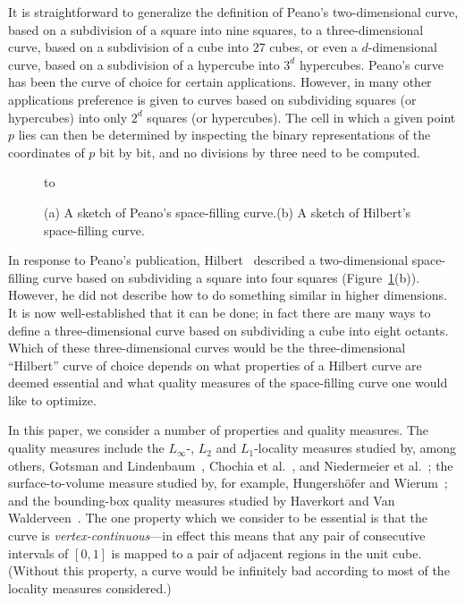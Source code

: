 \documentclass[11pt,a4paper]{article}
\begin{document}
It is straightforward to generalize the definition of Peano's two-dimensional curve, based on a subdivision of a square into nine squares, to a three-dimensional curve, based on a subdivision of a cube into 27 cubes, or even a $d$-dimensional curve, based on a subdivision of a hypercube into $3^d$ hypercubes. Peano's curve has been the curve of choice for certain applications. However, in many other applications preference is given to curves based on subdividing squares (or hypercubes) into only $2^d$ squares (or hypercubes). The cell in which a given point $p$ lies can then be determined by inspecting the binary representations of the coordinates of $p$ bit by bit, and no divisions by three need to be computed. 
\begin{figure}
\centering
\hbox to 
\caption{(a) A sketch of Peano's space-filling curve.\quad (b) A sketch of Hilbert's space-filling curve.}
\label{fig:peano2d}\label{fig:hilbert2d}
\end{figure}

In response to Peano's publication, Hilbert~\cite{Hilbert} described a two-dimensional space-filling curve based on subdividing a square into four squares (Figure~\ref{fig:hilbert2d}(b)). However, he did not describe how to do something similar in higher dimensions. It is now well-established that it can be done; in fact there are many ways to define a three-dimensional curve based on subdividing a cube into eight octants. Which of these three-dimensional curves would be the three-dimensional ``Hilbert'' curve of choice depends on what properties of a Hilbert curve are deemed essential and what quality measures of the space-filling curve one would like to optimize.

In this paper, we consider a number of properties and quality measures. The quality measures include the $L_\infty$-, $L_2$ and $L_1$-locality measures studied by, among others, Gotsman and Lindenbaum~\cite{Gotsman}, Chochia et al.~\cite{Chochia}, and Niedermeier et al.~\cite{Niedermeier,Niedermeier-Manhattan}; the surface-to-volume measure studied by, for example, Hungersh\"ofer and Wierum~\cite{Hungershoefer}; and the bounding-box quality measures studied by Haverkort and Van Walderveen~\cite{Haverkort}. The one property which we consider to be essential is that the curve is \emph{vertex-continuous}---in effect this means that any pair of consecutive intervals of $[0,1]$ is mapped to a pair of adjacent regions in the unit cube. (Without this property, a curve would be infinitely bad according to most of the locality measures considered.)
\end{document}
